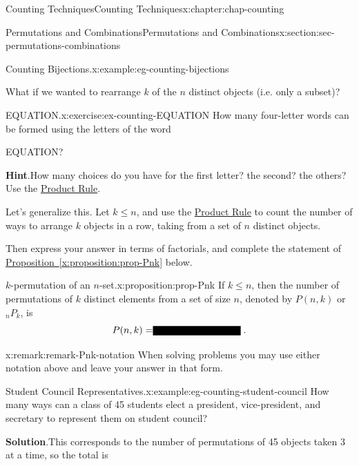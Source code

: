 \documentclass[oneside,10pt,]{book}
\newcommand{\blocktitlefont}{\relax}
\newcommand{\xreffont}{\relax}
\newcommand{\fillin}[1]{\leavevmode\leaders\vrule height -1.2pt depth 1.5pt \hskip #1em minus #1em \null}
\numberwithin{equation}{section}
\begin{document}
\begin{chapterptx}{Counting Techniques}{}{Counting Techniques}{}{}{x:chapter:chap-counting}
\begin{sectionptx}{Permutations and Combinations}{}{Permutations and Combinations}{}{}{x:section:sec-permutations-combinations}
\begin{example}{Counting Bijections.}{x:example:eg-counting-bijections}
\end{example}
What if we wanted to rearrange \(k\) of the \(n\) distinct objects (i.e. only a subset)?%
\begin{inlineexercise}{EQUATION.}{x:exercise:ex-counting-EQUATION}%
How many four-letter words can be formed using the letters of the word%
\begin{sidebyside}{1}{0.4}{0.4}{0}%
\begin{sbspanel}{0.2}%
EQUATION?%
\end{sbspanel}%
\end{sidebyside}%
\par\smallskip%
\noindent\textbf{\blocktitlefont Hint}.\hypertarget{g:hint:id440034}{}\quad{}How many choices do you have for the first letter? the second? the others? Use the \hyperref[x:principle:prin-prod-rule]{Product Rule}.%
\end{inlineexercise}
Let's generalize this. Let \(k \leq n\), and use the \hyperref[x:principle:prin-prod-rule]{Product Rule} to count the number of ways to arrange \(k\) objects in a row, taking from a set of \(n\) distinct objects.%
\par
Then express your answer in terms of factorials, and complete the statement of \hyperref[x:proposition:prop-Pnk]{Proposition~{\xreffont\ref{x:proposition:prop-Pnk}}} below.%
\begin{proposition}{\(k\)-permutation of an \(n\)-set.}{}{x:proposition:prop-Pnk}%
\label{g:notation:id440227} If \(k \leq n\), then the number of permutations of \(k\) distinct elements from a set of size \(n\), denoted by \(P(n,k)\) or \({}_nP_k\), is%
\begin{equation*}
P(n,k) = \fillin{9.090909090909092}\text{.}
\end{equation*}
%
\end{proposition}
\begin{remark}{}{x:remark:remark-Pnk-notation}%
When solving problems you may use either notation above and leave your answer in that form.%
\end{remark}
\begin{example}{Student Council Representatives.}{x:example:eg-counting-student-council}%
How many ways can a class of 45 students elect a president, vice-president, and secretary to represent them on student council?%
\par\smallskip%
\noindent\textbf{\blocktitlefont Solution}.\hypertarget{g:solution:id440371}{}\quad{}This corresponds to the number of permutations of 45 objects taken 3 at a time, so the total is%
\begin{equation*}

\end{equation*}
\end{example}
\end{sectionptx}
\end{chapterptx}
\end{document}

